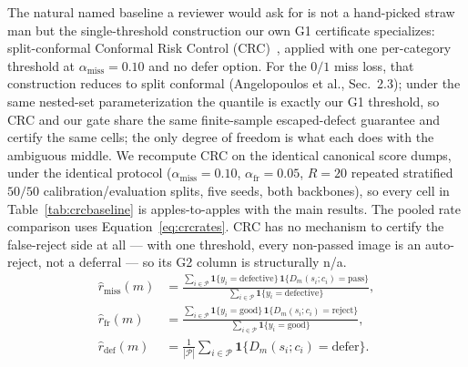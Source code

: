 \documentclass[preprint,11pt]{elsarticle}
\begin{document}
The natural named baseline a reviewer would ask for is not a hand-picked straw man but the
single-threshold construction our own G1 certificate specializes: split-conformal Conformal Risk
Control (CRC)~\citep{angelopoulos2022crc}, applied with one per-category threshold at
$\alpha_{\text{miss}}=0.10$ and no defer option. For the $0/1$ miss loss, that construction reduces
to split conformal (Angelopoulos et al., Sec.~2.3); under the same nested-set parameterization
the quantile is exactly our G1 threshold, so CRC and our gate share the same finite-sample
escaped-defect guarantee and certify the same cells; the only degree of freedom is what each does
with the ambiguous middle. We recompute CRC on the identical
canonical score dumps, under the identical protocol ($\alpha_{\text{miss}}=0.10$,
$\alpha_{\text{fr}}=0.05$, $R=20$ repeated stratified $50/50$ calibration/evaluation splits, five
seeds, both backbones), so every cell in Table~\ref{tab:crcbaseline} is apples-to-apples with the
main results. The pooled rate comparison uses Equation~\eqref{eq:crcrates}. CRC has no mechanism
to certify the false-reject side at all --- with one threshold, every non-passed image is an
auto-reject, not a deferral --- so its G2 column is structurally n/a.
\begin{equation}
\begin{aligned}
\widehat r_{\text{miss}}(m)
&=\frac{\sum_{i\in\mathcal P}\mathbf{1}\{y_i=\text{defective}\}
\,\mathbf{1}\{D_m(s_i;c_i)=\text{pass}\}}
{\sum_{i\in\mathcal P}\mathbf{1}\{y_i=\text{defective}\}},\\[2pt]
\widehat r_{\text{fr}}(m)
&=\frac{\sum_{i\in\mathcal P}\mathbf{1}\{y_i=\text{good}\}
\,\mathbf{1}\{D_m(s_i;c_i)=\text{reject}\}}
{\sum_{i\in\mathcal P}\mathbf{1}\{y_i=\text{good}\}},\\[2pt]
\widehat r_{\text{def}}(m)
&=\frac{1}{|\mathcal P|}\sum_{i\in\mathcal P}\mathbf{1}\{D_m(s_i;c_i)=\text{defer}\}.
\end{aligned}
\label{eq:crcrates}
\end{equation}
\end{document}
